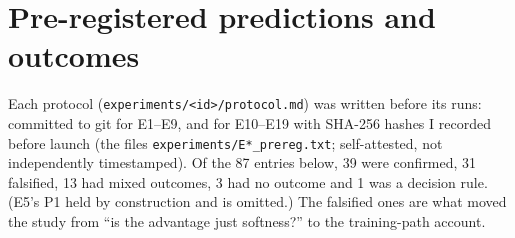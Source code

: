 \documentclass[11pt]{article}
\begin{document}
\section{Pre-registered predictions and outcomes}\label{app:ledger}
\begin{sloppypar}
Each protocol (\texttt{experiments/<id>/protocol.md}) was written before its
runs: committed to git for E1--E9, and for E10--E19 with SHA-256 hashes I
recorded before launch (the files \texttt{experiments/E*\_prereg.txt};
self-attested, not independently timestamped). Of the 87 entries below, 39 were confirmed, 31 falsified,
13 had mixed outcomes, 3 had no outcome and 1 was a decision rule. (E5's P1 held by construction and is omitted.) The falsified ones are what moved the study from ``is the advantage
just softness?'' to the training-path account.
\end{sloppypar}
\end{document}

